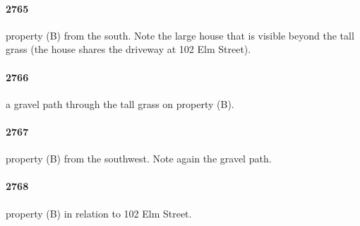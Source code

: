 \documentclass[12pt]{article}
\begin{document}
\paragraph{2765} property (B) from the south.  Note the large house that is visible beyond the tall grass (the house shares the driveway at 102 Elm Street).
\paragraph{2766} a gravel path through the tall grass on property (B).
\paragraph{2767} property (B) from the southwest.  Note again the gravel path.
\paragraph{2768} property (B) in relation to 102 Elm Street.
\end{document}
